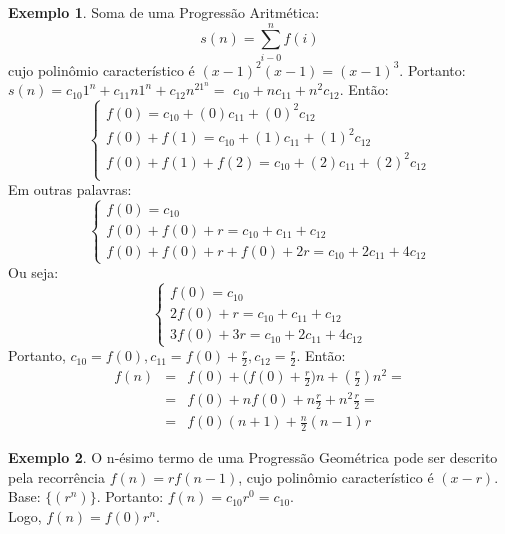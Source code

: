 \documentclass[a4paper,11pt]{article}
\theoremstyle{definition} \newtheorem{definicao}{Def}
\theoremstyle{definition} \newtheorem{exemplo}{Exemplo}
\theoremstyle{plain}      \newtheorem{teorema}{Teorema}
\theoremstyle{remark}     \newtheorem*{corolario}{Corol\'{a}rio}
\begin{document}
\begin{exemplo}
Soma de uma Progress\~{a}o Aritm\'{e}tica:
\begin{equation*}
s(n) = \sum_{i-0}^{n} f(i)
\end{equation*}
cujo polin\^{o}mio caracter\'{i}stico \'{e} $(x-1)^2(x-1)=(x-1)^3$.
Portanto: \\ $s(n) = c_{10}1^n + c_{11}n1^n + c_{12}n^21^n =$
$c_{10}+nc_{11}+n^2c_{12}$. Ent\~{a}o:
\begin{equation*}
\begin{cases}
f(0) = c_{10}+(0)c_{11}+(0)^2c_{12} \\
f(0) + f(1) = c_{10}+(1)c_{11}+(1)^2c_{12} \\
f(0)+f(1)+f(2) = c_{10}+(2)c_{11}+(2)^2c_{12}\\
\end{cases}
\end{equation*}
Em outras palavras:
\begin{equation*}
\begin{cases}
f(0) = c_{10} \\
f(0) + f(0) + r = c_{10}+c_{11}+c_{12} \\
f(0)+f(0)+r+f(0)+2r = c_{10}+2c_{11}+4c_{12}
\end{cases}
\end{equation*}
Ou seja:
\begin{equation*}
\begin{cases}
f(0) = c_{10} \\
2f(0) + r = c_{10}+c_{11}+c_{12} \\
3f(0)+3r = c_{10}+2c_{11}+4c_{12}
\end{cases}
\end{equation*}
Portanto, $c_{10}=f(0),c_{11}=f(0)+\frac{r}{2},c_{12}=\frac{r}{2}$.
Ent\~{a}o:
\begin{eqnarray*}
f(n) & = & f(0)+\Big(f(0) + \frac{r}{2}\Big)n + (\frac{r}{2})n^2 = \\
& = & f(0)+nf(0)+n\frac{r}{2}+n^2\frac{r}{2} = \\
& = & f(0)(n+1) + \frac{n}{2}(n-1)r
\end{eqnarray*}
\end{exemplo}

\begin{exemplo}
O n-\'{e}simo termo de uma Progress\~{a}o Geom\'{e}trica pode ser
descrito pela recorr\^{e}ncia $f(n)=rf(n-1)$, cujo polin\^{o}mio
caracter\'{i}stico \'{e} $(x-r)$. Base: $\{(r^n)\}$. Portanto:
$f(n) = c_{10}r^0 = c_{10}.$ \\
Logo, $f(n)=f(0)r^n$.
\end{exemplo}
\end{document}
